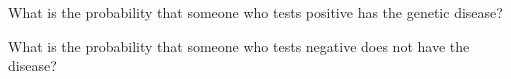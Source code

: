 \documentclass[12pt]{exam}
\begin{document}
\begin{qparts}
    \item What is the probability that someone who tests positive has the genetic disease?
    \item What is the probability that someone who tests negative does not have the disease?
\end{qparts}

\begin{solution}
    ~\\~\\~\\~\\~\\~\\~\\~\\~\\~\\~\\~\\~\\~\\~\\~\\~\\~\\~\\~\\~\\~\\~\\~\\~\\~\\~\\~\\
\end{solution}
\end{document}
